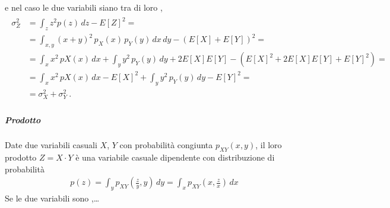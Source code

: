 \documentclass[letterpaper,10pt,italian]{jupyterBook}
\begin{document}
\sphinxAtStartPar
e nel caso le due variabili siano tra di loro ,
\begin{equation*}
\begin{split}\begin{aligned}
  \sigma_Z^2 
  & = \int_z z^2 p(z) \, dz - E[Z]^2 = \\
  & = \int_{x,y} (x+y)^2 \, p_{X}(x) \, p_{Y}(y) \, dx \, dy - \left(E[X] + E[Y]\right)^2 = \\
  & = \int_{x} x^2 \, p{X}(x) \, dx + \int_{y} y^2 \, p_Y(y) \, dy + 2 E[X] E[Y] - \left( E[X]^2 + 2 E[X] E[Y] + E[Y]^2 \right) = \\
  & = \int_{x} x^2 \, p{X}(x) \, dx - E[X]^2 + \int_{y} y^2 \, p_Y(y) \, dy - E[Y]^2 = \\
  & = \sigma_X^2 + \sigma_Y^2 \ .
\end{aligned}\end{split}
\end{equation*}

\subparagraph{Prodotto}
\label{\detokenize{ch/statistics/rv_pdf_transformations:prodotto}}
\sphinxAtStartPar
Date due variabili casuali \(X\), \(Y\) con probabilità congiunta \(p_{XY}(x,y)\), il loro prodotto \(Z = X \cdot Y\) è una variabile casuale dipendente con distribuzione di probabilità
\begin{equation*}
\begin{split}p(z) = \int_{y} p_{XY} \left(\frac{z}{y}, y \right) \, dy = \int_{x} p_{XY} \left(x, \frac{z}{x} \right) \, dx\end{split}
\end{equation*}
\sphinxAtStartPar
Se le due variabili sono ,…
\end{document}
